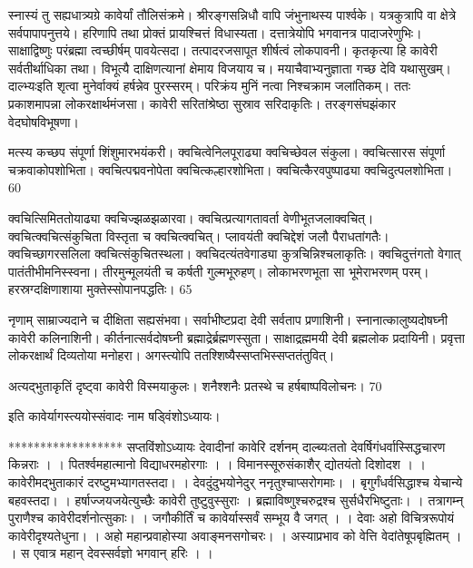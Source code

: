 स्नास्यं तु सह्यधात्र्यग्रे कावेर्यां तौलिसंक्रमे।
श्रीरङ्गसन्निधौ वापि जंभुनाथस्य पार्श्वके।
यत्रकुत्रापि वा क्षेत्रे सर्वपापापनुत्तये।
हरिणापि तथा प्रोक्तं प्रायश्चित्तं विधास्यता।
दत्तात्रेयोपि भगवानत्र पादाजरेणुभिः।
साक्षाद्विष्णुः परंब्रह्मा त्वच्छीर्षम् पावयेत्सदा।
तत्पादरजसापूत शीर्षत्वं लोकपावनी।
कृतकृत्या हि कावेरी सर्वतीर्थाधिका तथा।
विभूत्यै दाक्षिणत्यानां क्षेमाय विजयाय च।
मयाचैवाभ्यनुज्ञाता गच्छ देवि यथासुखम्।
दाल्भ्यःइति शृत्वा मुनेर्वाक्यं हर्षन्नेव पुरस्सरम्।
परिक्रंय मुनिं नत्वा निश्चक्राम जलांतिकम्।
ततः प्रकाशमापन्ना लोकरक्षार्थमंजसा।
कावेरी सरितांश्रेष्ठा सुस्राव सरिदाकृतिः।
तरङ्गसंघझंकार वेदघोषविभूषणा।

मत्स्य कच्छप संपूर्णा शिंशुमारभयंकरी।
क्वचित्वेनिलपूराढ्या क्वचिच्छेवल संकुला।
क्वचित्सारस संपूर्णा चक्रवाकोपशोभिता।
क्वचित्पद्मवनोपेता क्वचित्कल्हारशोभिता।
क्वचित्कैरवपुष्पाढ्या क्वचिदुत्पलशोभिता।
60

क्वचित्सिमिततोयाढ्या क्वचिज्झळझळारवा।
क्वचित्प्रत्यागतावर्ता वेणीभूतजलाक्वचित्।
क्वचित्क्वचित्संकुचिता विस्तृता च क्वचित्क्वचित्।
प्लावयंती क्वचिद्देशं जलौ पैराधतांगतैः।
क्वचिच्छागरसलिला क्वचित्संकुचितस्थला।
क्वचिदत्यंतवेगाड्या कुत्रचिन्निश्चलाकृतिः।
क्वचिदुत्तंगतो वेगात् पातंतीभीमनिस्स्वना।
तीरमुन्मूलयंती च कर्षती गुल्मभूरुहण्।
लोकाभरणभूता सा भूमेराभरणम् परम्।
हरस्रग्दक्षिणाशाया मुक्तेस्सोपानपद्धतिः।
65

नृणाम् साम्राज्यदाने च दीक्षिता सह्यसंभवा।
सर्वाभीष्टप्रदा देवी सर्वताप प्रणाशिनी।
स्नानात्कालुष्यदोषघ्नी कावेरी कलिनाशिनी।
कीर्तनात्सर्वदोषघ्नी ब्रह्माद्रेर्ब्रह्मणस्सुता।
साक्षाद्रह्ममयी देवी ब्रह्मलोक प्रदायिनी।
प्रवृत्ता लोकरक्षार्थं दिव्यतोया मनोहरा।
अगस्त्योपि ततश्शिष्यैस्सप्तभिस्सप्ततंतुवित्।

अत्यद्भुताकृतिं दृष्ट्वा कावेरी विस्मयाकुलः।
शनैश्शनैः प्रतस्थे च हर्षबाष्पविलोचनः।
70

इति कावेर्यागस्त्ययोस्संवादः नाम षड्विंशोऽध्यायः।

******************
सप्तविंशोऽध्यायः
देवादीनां कावेरि दर्शनम् दाल्ब्यःततो देवर्षिगंधर्वास्सिद्धचारण किन्नराः ।
।
पितर्श्वमहात्मानो विद्याधरमहोरगाः ।
।
विमानस्सूरुसंकाशैर् द्योतयंतो दिशोदश ।
।
कावेरीमद्भुताकारं दरष्टुमभ्यागतस्तदा।
।
देवदुंदुभयोनेदुर् ननृतुश्चाप्सरोगमाः।
।
बृगुर्गंधर्वसिद्धाश्च येचान्ये बहवस्तदा।
।
हर्षाज्जयजयेत्युच्छैः कावेरी तुष्टुवुस्सुराः ।
ब्रह्माविष्णुश्चरुद्रश्च सुर्सधैरभिष्टुताः।
।
तत्रागम्न् पुराणैश्च कावेरीदर्शनोत्सुकाः।
।
जगौकीर्तिं च कावेर्यास्सर्वं सम्भूय वै जगत् ।
।
देवाः अहो विचित्ररूपोयं कावेरीदृश्यतेधुना।
।
अहो महान्प्रवाहोस्या अवाङ्मनसगोचरः।
।
अस्याप्रभाव को वेत्ति वेदांतेषूपबृह्मितम् ।
।
स एवात्र महान् देवस्सर्वज्ञो भगवान् हरिः ।
।

